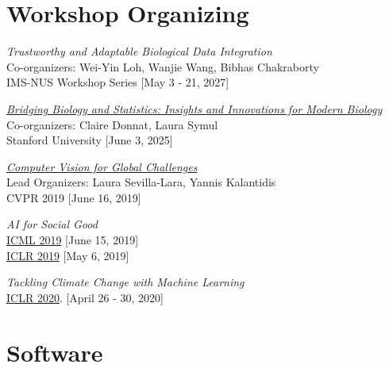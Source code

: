 \documentclass[letterpaper]{article}
\renewenvironment{itemize}{
  \begin{list}{}{
    \setlength{\leftmargin}{1.5em}
  }
}{
  \end{list}
}
\begin{document}
\section*{Workshop Organizing}

\begin{itemize}

\item \textit{Trustworthy and Adaptable Biological Data Integration}\\
Co-organizers: Wei-Yin Loh, Wanjie Wang, Bibhas Chakraborty\\
IMS-NUS Workshop Series [May 3 - 21, 2027]

\item \href{https://www.eventcreate.com/e/stats4modernbiology}{\textit{Bridging Biology and Statistics: Insights and Innovations for Modern Biology}}\\
Co-organizers: Claire Donnat, Laura Symul\\
Stanford University [June 3, 2025]

\item \href{https://www.cv4gc.org/cvpr2019/}{\textit{Computer Vision for Global Challenges}}\\
Lead Organizers: Laura Sevilla-Lara, Yannis Kalantidis\\
CVPR 2019 [June 16, 2019]

\item \textit{AI for Social Good} \\
\href{https://aiforsocialgood.github.io/icml2019/}{ICML 2019} [June 15, 2019]\\
\href{https://aiforsocialgood.github.io/icml2019}{ICLR 2019} [May 6, 2019]

\item \textit{Tackling Climate Change with Machine Learning}\\
\href{https://www.climatechange.ai/events/iclr2020}{ICLR 2020}. [April 26 - 30, 2020]
\end{itemize}

\section*{Software}
\end{document}
